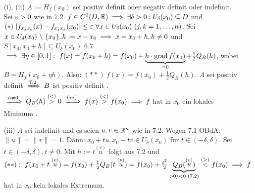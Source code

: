 \documentclass[a4paper,oneside,DIV15,BCOR12mm,chapterprefix=true,headings=onelinechapter]{scrbook}
\begin{document}
\begin{beweis}
\begin{enumerate}
\item[(i),]
(ii) $A:=H_f(x_0)$ sei positiv definit oder negativ definit oder indefinit. Sei $\varepsilon>0$ wie in 7.2. $f\in C^2(D,\mathbb{R})\implies \exists \delta>0: U_\delta(x_0)\subseteq D$ und $(*)\ |f_{x_jx_k}(x)-f_{x_jx_k}(x_0)|\le\ep\ \forall x\in U_\delta(x_0)\ (j,k=1,\ldots,n)$. Sei $x\in U_\delta(x_0) \ \backslash\ \{x_0\}, h:=x-x_0\implies x=x_0+h, h\ne 0$ und $S[x_0,x_0+h] \subseteq U_\delta(x_0)$ 6.7$\folgt\exists \eta\in [0,1]:\ f(x)=f(x_0+h)=f(x_0) + \underbrace{h\cdot \grad f(x_0)}_{=0}+\frac{1}{2}Q_B(h)$, wobei $B=H_f(x_0 + \eta h)$. Also: $(**)\ f(x)=f(x_0)+\frac{1}{2}Q_B(h)$. $A$ sei positiv definit  $\folgtnach{7.2} B$ ist positiv definit . $\folgtwegen{h\ne 0}Q_B(h)\stackrel{(<)}{>}0 \folgtwegen{(**)}f(x)\stackrel{(<)}{>}f(x_0)\folgt f$ hat in $x_0$ ein lokales Minimum .
\item[(iii)]$A$ sei indefinit und es seien $u, v\in\mathbb{R}^n$ wie in 7.2. Wegen 7.1 OBdA: $\|u\|=\|v\|=1$. Dann: $x_0+tu, x_0+tv \in U_\delta(x_0)$ für $t\in(-\delta, \delta)$. Sei $t\in(-\delta, \delta), t\ne 0$. Mit $h:=t\stackrel{(v)}{u}$ folgt aus 7.2 und $(**):\ f(x_0+t\stackrel{(v)}{u})=f(x_0)+\frac{1}{2}Q_B(t\stackrel{(v)}{u})=f(x_0)+\frac{t^2}{2}\underbrace{Q_B(\stackrel{(v)}{u})}_{>0\text{/}<0\text{ (7.2)}}\stackrel{(>)}{<}f(x_0)\folgt f$ hat in $x_0$ kein lokales Extremum.
\end{enumerate}
\end{beweis}
\end{document}
